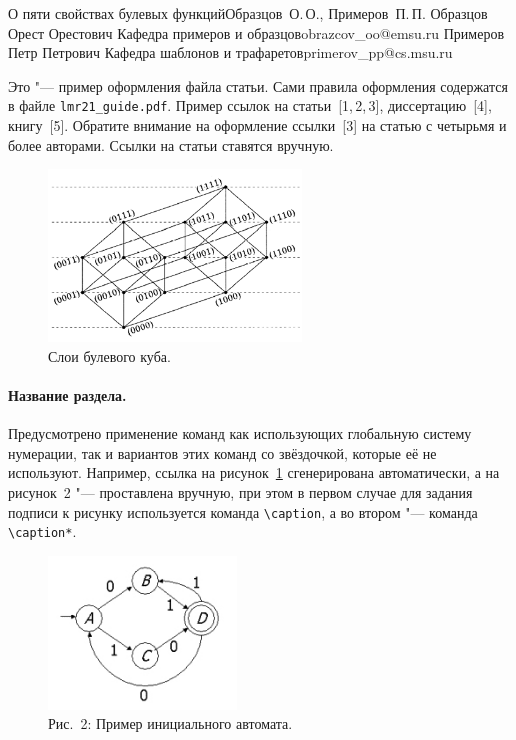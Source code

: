 \begin{lmrarticle}%
{О пяти свойствах булевых функций}{Образцов~О.\,О., Примеров~П.\,П.}
\TwoAuthor%
{Образцов Орест Орестович}%
    {Кафедра примеров и образцов}{obrazcov\_oo@emsu.ru}%
{Примеров Петр Петрович}%
    {Кафедра шаблонов и трафаретов}{primerov\_pp@cs.msu.ru}

%
%

Это "--- пример оформления файла статьи. Сами правила оформления содержатся в
файле \texttt{lmr21\_guide.pdf}. Пример ссылок на статьи~[1,\,2,\,3],
диссертацию~[4], книгу~[5]. Обратите внимание на оформление ссылки~[3] на
статью с четырьмя и более авторами. Ссылки на статьи ставятся вручную.
\begin{figure}[ht]
\centering
\includegraphics[width=0.6\textwidth]{bcube}
\caption{Слои булевого куба.}
\label{fi:bcube}
\end{figure}

\paragraph{Название раздела.}
Предусмотрено применение команд как использующих глобальную систему
нумерации, так и вариантов этих команд со звёздочкой, которые её не используют.
Например, ссылка на рисунок~\ref{fi:bcube} сгенерирована автоматически, а на
рисунок~2 "--- проставлена вручную, при этом в первом случае для задания
подписи к рисунку используется команда \verb|\caption|, а во втором "---
команда
\verb|\caption*|.
\begin{figure}[ht]
\centering
\includegraphics[width=5cm]{smach}
\caption*{Рис.~2: Пример инициального автомата.}
\end{figure}


\end{lmrarticle}
